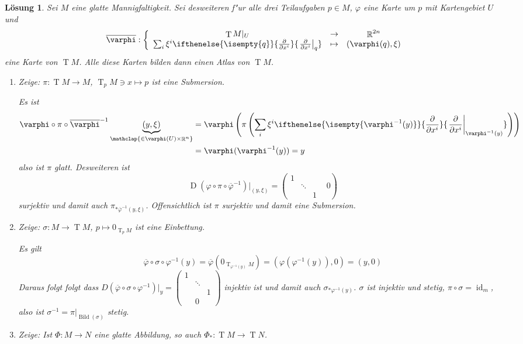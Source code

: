 \documentclass[paper=A4, twoside, chapterprefix=true, bibliography=totoc, headsepline]{scrbook}
\let\temp\phi
\let\phi\varphi
\let\varphi\temp
\let\temp\theta
\let\theta\vartheta
\let\vartheta\temp
\let\temp\epsilon
\let\epsilon\varepsilon
\let\varepsilon\temp
\let\temp\rho
\let\rho\varrho
\let\varrho\temp
\DeclareMathOperator{\R}{\mathbb{R}}
\DeclareMathOperator{\Bild}{Bild}
\DeclareMathOperator{\D}{D} %
\DeclareMathOperator{\Id}{id} %
\DeclareMathOperator{\T}{T} %
\newcommand{\X}{\times}
\newcommand{\pdifffrac}[3][]{\ifthenelse{\isempty{#1}}{\frac{\partial #2}{\partial #3}}{\left. \frac{\partial #2}{\partial #3} \right|_{#1}}}
\theoremstyle{plain}
\theoremstyle{nonumberplain}
\theoremstyle{empty}
\theoremstyle{break}
\newtheorem{Loes}{L\"osung}
\begin{document}
\begin{Loes}
Sei $M$ eine glatte Mannigfaltigkeit. Sei desweiteren f"ur alle drei Teilaufgaben $p \in M$, $\phi$ eine Karte um $p$ mit Kartengebiet $U$ und
	\[ \overline \phi: \left\{ \begin{array}{ccc}  \T M|_U &\to& \R^{2n} \\
		\sum_i \xi^i\pdifffrac[q]{}{x^i} &\mapsto& (\phi(q), \xi) \end{array} \right.\]
eine Karte von $\T M$. Alle diese Karten bilden dann einen Atlas von $\T M$.
\begin{enumerate}[label=\alph*),widest=a,leftmargin=*]
\item
	\emph{Zeige:} $\pi: \T M \to M$, $\T_p M \ni x \mapsto p$ ist eine Submersion.
	
	Es ist
	\begin{align*} \phi \circ \pi \circ \overline \phi^{-1} \underbrace{(y, \xi)}_{\mathclap{\in \phi(U) \X \R^n}} &= \phi\left(\pi\left(\sum_i \xi^i \pdifffrac[\phi^{-1}(y)]{}{x^i}\right)\right)\\
		&= \phi(\phi^{-1}(y)) = y
	\end{align*}
	also ist $\pi$ glatt. Desweiteren ist
		\[ \D(\phi \circ \pi \circ \overline \phi^{-1})|_{(y, \xi)} = \left(\begin{smallmatrix}
        1 &  & \\
        & \ddots & & \\
         & & 1
      \end{smallmatrix} 0\right) \]
     surjektiv und damit auch $\pi_{*\overline\phi^{-1}(y, \xi)}$. Offensichtlich ist $\pi$ surjektiv und damit eine Submersion.
\item
	\emph{Zeige:} $\sigma: M \to \T M$, $p \mapsto 0_{\T_pM}$ ist eine Einbettung.
	
	Es gilt
		\[\overline \phi \circ \sigma \circ \phi^{-1} (y) = \overline \phi(0_{\T_{\phi^{-1}(y)}M}) = (\phi(\phi^{-1}(y)),0) = (y,0) \]
	Daraus folgt folgt dass $D(\overline \phi \circ \sigma \circ \phi^{-1})|_y = \left( \begin{smallmatrix} 1 & &  \\ & \ddots & \\ & & 1 \\ & 0 & \end{smallmatrix} \right)$ injektiv ist und damit auch $\sigma_{* \phi^{-1}(y)}$. $\sigma$ ist injektiv und stetig, $\pi \circ \sigma = \Id_m$, also ist $\sigma^{-1} = \pi|_{\Bild(\sigma)}$ stetig.
\item
	\emph{Zeige:} Ist $\Phi: M \to N$ eine glatte Abbildung, so auch $\Phi_*: \T M \to \T N$.
	

\end{enumerate}
\end{Loes}
\end{document}
